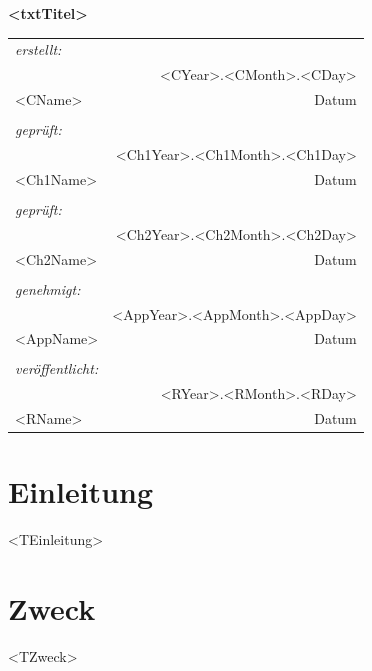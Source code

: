 \documentclass[a4paper,10pt,oneside,notitlepage]{article}
\renewcommand{\arraystretch}{1.3}
\begin{document}
\begin{center}
\textcolor{dark blue}{\textbf{\Large{<txtTitel>}}}


\begin{table}[H]
\centering
\renewcommand{\arraystretch}{1.8}
\setlength{\tabcolsep}{0.8cm}
\begin{tabular}{llr}
\multicolumn{3}{l}{\textit{erstellt:}} \\
\multicolumn{2}{l}{} & <CYear>.<CMonth>.<CDay> \\ \hline
\multicolumn{2}{l}{<CName>} & Datum \\ \hline
\multicolumn{3}{l}{} \\
\multicolumn{3}{l}{\textit{geprüft:}} \\
\multicolumn{2}{l}{} & <Ch1Year>.<Ch1Month>.<Ch1Day> \\ \hline
\multicolumn{2}{l}{<Ch1Name>} & Datum \\ \hline
\multicolumn{3}{l}{} \\
\multicolumn{3}{l}{\textit{geprüft:}} \\
\multicolumn{2}{l}{} & <Ch2Year>.<Ch2Month>.<Ch2Day> \\ \hline
\multicolumn{2}{l}{<Ch2Name>} & Datum \\ \hline
\multicolumn{3}{l}{} \\
\multicolumn{3}{l}{\textit{genehmigt:}} \\
\multicolumn{2}{l}{} & <AppYear>.<AppMonth>.<AppDay> \\ \hline
\multicolumn{2}{l}{<AppName>} & Datum \\ \hline
\multicolumn{3}{l}{} \\
\multicolumn{3}{l}{\textit{veröffentlicht:}} \\
\multicolumn{2}{l}{} & <RYear>.<RMonth>.<RDay> \\ \hline
\multicolumn{2}{l}{<RName>} & Datum \\ \hline
\end{tabular}
\end{table}
\end{center}

\newpage
\tableofcontents

\newpage

\section{Einleitung}
<TEinleitung>


\section{Zweck}
<TZweck>
\end{document}
